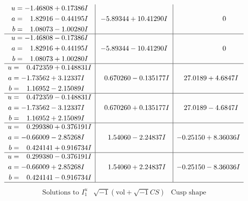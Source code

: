 \documentclass[1p]{elsarticle_modified}
\theoremstyle{definition}
\newcommand{\I}{\sqrt{-1}}
\begin{document}
$$\begin{array}{c|c|c}
\begin{aligned}
u &= -1.46808 + 0.17386 I \\
a &= \phantom{-}1.82916 - 0.44195 I \\
b &= \phantom{-}1.08073 - 1.00280 I\end{aligned}
 & -5.89344 + 10.41290 I & \phantom{-0.000000 } 0 \\ \hline\begin{aligned}
u &= -1.46808 - 0.17386 I \\
a &= \phantom{-}1.82916 + 0.44195 I \\
b &= \phantom{-}1.08073 + 1.00280 I\end{aligned}
 & -5.89344 - 10.41290 I & \phantom{-0.000000 } 0 \\ \hline\begin{aligned}
u &= \phantom{-}0.472359 + 0.148831 I \\
a &= -1.73562 + 3.12337 I \\
b &= \phantom{-}1.16952 - 2.15089 I\end{aligned}
 & \phantom{-}0.670260 - 0.135177 I & \phantom{-}27.0189 + 4.6847 I \\ \hline\begin{aligned}
u &= \phantom{-}0.472359 - 0.148831 I \\
a &= -1.73562 - 3.12337 I \\
b &= \phantom{-}1.16952 + 2.15089 I\end{aligned}
 & \phantom{-}0.670260 + 0.135177 I & \phantom{-}27.0189 - 4.6847 I \\ \hline\begin{aligned}
u &= \phantom{-}0.299380 + 0.376191 I \\
a &= -0.66009 - 2.85268 I \\
b &= \phantom{-}0.424141 + 0.916734 I\end{aligned}
 & \phantom{-}1.54060 - 2.24837 I & -0.25150 + 8.36036 I \\ \hline\begin{aligned}
u &= \phantom{-}0.299380 - 0.376191 I \\
a &= -0.66009 + 2.85268 I \\
b &= \phantom{-}0.424141 - 0.916734 I\end{aligned}
 & \phantom{-}1.54060 + 2.24837 I & -0.25150 - 8.36036 I\\
 \hline 
 \end{array}$$\newpage$$\begin{array}{c|c|c}  
\text{Solutions to }I^u_{1}& \I (\text{vol} + \sqrt{-1}CS) & \text{Cusp shape}\\

\end{array}$$
\end{document}
